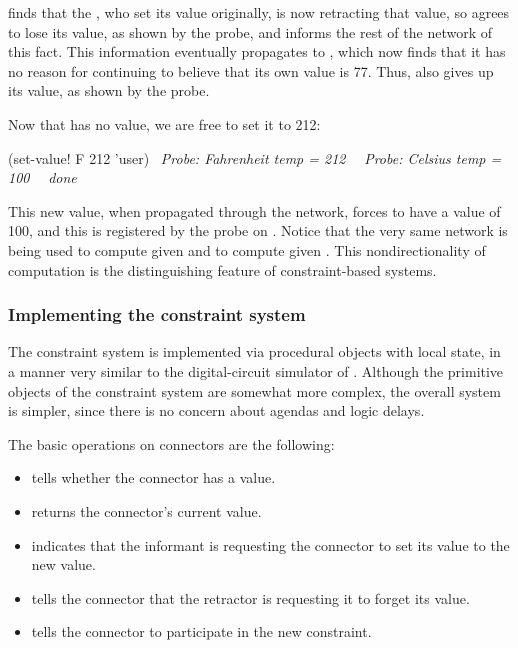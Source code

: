 \noindent
{} finds that the , who set its value originally, is now
retracting that value, so  agrees to lose its value, as shown by the
probe, and informs the rest of the network of this fact.  This information
eventually propagates to , which now finds that it has no reason for
continuing to believe that its own value is 77.  Thus,  also gives up
its value, as shown by the probe.

Now that  has no value, we are free to set it to 212:

\begin{codeBlock}
(set-value! F 212 'user)
~\textit{Probe: Fahrenheit temp = 212}~
~\textit{Probe: Celsius temp = 100}~
~\textit{done}~
\end{codeBlock}

\noindent
This new value, when propagated through the network, forces  to have a
value of 100, and this is registered by the probe on .  Notice that the
very same network is being used to compute  given  and to
compute  given .  This nondirectionality of computation is the
distinguishing feature of constraint-based systems.

\subsubsection*{Implementing the constraint system}

The constraint system is implemented via procedural objects with local state,
in a manner very similar to the digital-circuit simulator of
.  Although the primitive objects of the constraint system are
somewhat more complex, the overall system is simpler, since there is no concern
about agendas and logic delays.

The basic operations on connectors are the following:

\begin{itemize}
\item
{} tells whether the connector has a value.

\item
{} returns the connector's current value.

\item
{}
indicates that the informant is requesting the connector to set its value to
the new value.

\item
{} tells the connector
that the retractor is requesting it to forget its value.

\item
{} tells the connector
to participate in the new constraint.
\end{itemize}

